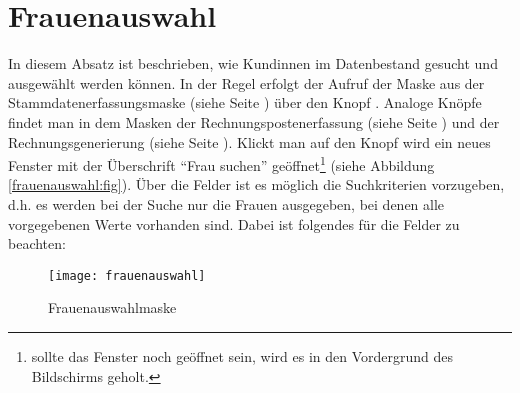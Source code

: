 \section{Frauenauswahl}\label{frauenauswahl:abs}
In diesem Absatz ist beschrieben, wie Kundinnen im Datenbestand gesucht und
ausgewählt werden können.
In der Regel erfolgt der  Aufruf der Maske aus der 
Stammdatenerfassungsmaske (siehe
Seite \pageref{stammdatenerfassung:fig}) 
über den Knopf . Analoge Knöpfe findet man in dem Masken der
Rechnungspostenerfassung (siehe Seite \pageref{rechnungspostenerfassen:fig})
und der
Rechnungsgenerierung (siehe Seite \pageref{rechnungsgenerierung:fig}).
Klickt man auf den Knopf  wird ein neues Fenster mit der
Überschrift ``Frau suchen'' geöffnet\footnote{sollte das Fenster 
noch geöffnet sein, wird es in den 
Vordergrund des Bildschirms geholt.} 
(siehe Abbildung \vref{frauenauswahl:fig}). Über die Felder  ist es möglich die
Suchkriterien vorzugeben, d.h. es werden bei der Suche nur die Frauen
ausgegeben, bei denen alle vorgegebenen Werte vorhanden sind. Dabei ist
folgendes für die Felder zu beachten:

\begin{figure}[h]
\centering
\texttt{[image: frauenauswahl]}
\caption{Frauenauswahlmaske\label{frauenauswahl:fig}}
\end{figure}

